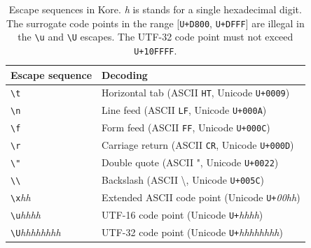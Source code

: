 \documentclass[UTF8,11pt]{article}
\theoremstyle{plain}
\theoremstyle{definition}
\theoremstyle{remark}
\begin{document}
\begin{table}[h]
	\centering
  \begin{tabular}{l|l}
    Escape sequence & Decoding
    \\
    \hline
    \texttt{\textbackslash t}
    & Horizontal tab (ASCII \texttt{HT}, Unicode \texttt{U+0009})
    \\
    \texttt{\textbackslash n}
    & Line feed (ASCII \texttt{LF}, Unicode \texttt{U+000A})
    \\
    \texttt{\textbackslash f}
    & Form feed (ASCII \texttt{FF}, Unicode \texttt{U+000C})
    \\
    \texttt{\textbackslash r}
    & Carriage return (ASCII \texttt{CR}, Unicode \texttt{U+000D})
    \\
    \texttt{\textbackslash "}
    & Double quote (ASCII ", Unicode \texttt{U+0022})
    \\
    \texttt{\textbackslash \textbackslash}
    & Backslash (ASCII \textbackslash, Unicode \texttt{U+005C})
    \\
    \texttt{\textbackslash x}\textit{hh}
    & Extended ASCII code point (Unicode \texttt{U+}\textit{00hh})
    \\
    \texttt{\textbackslash u}\textit{hhhh}
    & UTF-16 code point (Unicode \texttt{U+}\textit{hhhh})
    \\
    \texttt{\textbackslash U}\textit{hhhhhhhh}
    & UTF-32 code point (Unicode \texttt{U+}\textit{hhhhhhhh})
  \end{tabular}
  \caption{
    Escape sequences in Kore. \textit{h} is stands for a single hexadecimal
    digit. The surrogate code points in the range [\texttt{U+D800},
    \texttt{U+DFFF}] are illegal in the \texttt{\textbackslash u} and
    \texttt{\textbackslash U} escapes. The UTF-32 code point must not exceed
    \texttt{U+10FFFF}.
  }
	\label{tab:lexicon-escapes}
\end{table}
\end{document}
